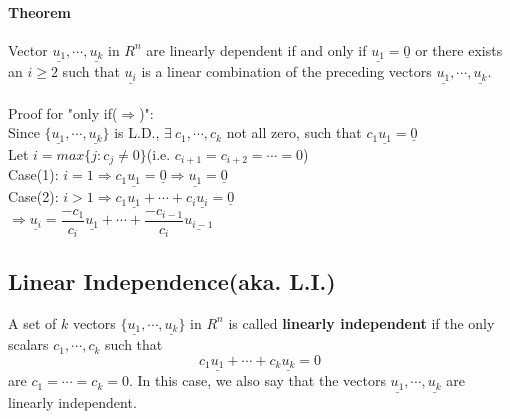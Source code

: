 \documentclass[12pt]{article}
\begin{document}
\paragraph{Theorem}
Vector $\underline{u_1},\cdots,\underline{u_k}$ in $R^n$ are linearly dependent if and only if $\underline{u_1} = \underline{0}$ or there exists an $i\geq 2$ such that $\underline{u_i}$ is a linear combination of the preceding vectors $\underline{u_1},\cdots,\underline{u_k}$.\\\\
Proof for "only if($\Rightarrow$)":\\
Since $\lbrace \underline{u_1},\cdots,\underline{u_k}\rbrace$ is L.D., $\exists\ c_1,\cdots,c_k$ not all zero, such that $c_1\underline{u_1}=\underline{0}$\\
Let $i=max\lbrace j:c_j\neq 0\rbrace$(i.e. $c_{i+1}=c_{i+2}=\cdots=0$)\\
Case(1): $i=1 \Rightarrow c_1\underline{u_1}=\underline{0} \Rightarrow \underline{u_1}=\underline{0}$\\
Case(2): $i>1 \Rightarrow c_1\underline{u_1}+\cdots+c_i\underline{u_i}=\underline{0}$\\
$\Rightarrow \underline{u_i}=\dfrac{-c_1}{c_i}\underline{u_1}+\cdots+\dfrac{-c_{i-1}}{c_i}\underline{u_{i-1}}$

\subsection{Linear Independence(aka. L.I.)}
A set of $k$ vectors $\lbrace \underline{u_1}, \cdots ,\underline{u_k}\rbrace$ in $R^n$ is called \textbf{linearly independent} if the only scalars $c_1, \cdots, c_k$ such that
$$
c_1\underline{u_1} + \cdots + c_k\underline{u_k} = 0
$$
are $c_1=\cdots=c_k=0$. In this case, we also say that the vectors $\underline{u_1}, \cdots ,\underline{u_k}$ are linearly independent.
\end{document}
